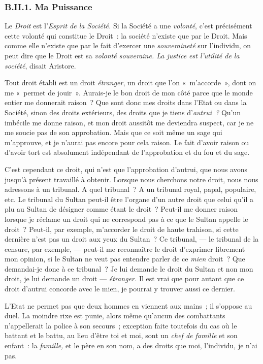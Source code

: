 \documentclass[french,twoside]{book} %
\begin{document}
\subsubsection[{B.II.1. Ma Puissance}]{B.II.1. Ma Puissance}
\noindent Le \emph{Droit} est l’\emph{Esprit de la Société.} Si la Société a une \emph{volonté}, c’est précisément cette volonté qui constitue le Droit : la société n’existe que par le Droit. Mais comme elle n’existe que par le fait d’exercer une \emph{souveraineté} sur l’individu, on peut dire que le Droit est sa \emph{volonté souveraine. La justice est l’utilité de la société}, disait Aristore.\par
Tout droit établi est un droit \emph{étranger}, un droit que l’on « m’accorde », dont on me « permet de jouir ». Aurais-je le bon droit de mon côté parce que le monde entier me donnerait raison ? Que sont donc mes droits dans l’Etat ou dans la Société, sinon des droits extérieurs, des droits que je tiens d’\emph{autrui ?} Qu’un imbécile me donne raison, et mon droit aussitôt me deviendra suspect, car je ne me soucie pas de son approbation. Mais que ce soit même un sage qui m’approuve, et je n’aurai pas encore pour cela raison. Le fait d’avoir raison ou d’avoir tort est absolument  indépendant de l’approbation et du fou et du sage.\par
C’est cependant ce droit, qui n’est que l’approbation d’autrui, que nous avons jusqu’à présent travaillé à obtenir. Lorsque nous cherchons notre droit, nous nous adressons à un tribunal. A quel tribunal ? A un tribunal royal, papal, populaire, etc. Le tribunal du Sultan peut-il être l’organe d’un autre droit que celui qu’il a plu au Sultan de désigner comme étant le droit ? Peut-il me donner raison lorsque je réclame un droit qui ne correspond pas à ce que le Sultan appelle le droit ? Peut-il, par exemple, m’accorder le droit de haute trahison, si cette dernière n’est pas un droit aux yeux du Sultan ? Ce tribunal, — le tribunal de la censure, par exemple, — peut-il me reconnaître le droit d’exprimer librement mon opinion, si le Sultan ne veut pas entendre parler de ce \emph{mien} droit ? Que demandai-je donc à ce tribunal ? Je lui demande le droit du Sultan et non mon droit, je lui demande un droit — \emph{étranger. }Il est vrai que pour autant que ce droit d’autrui concorde avec le mien, je pourrai y trouver aussi ce dernier.\par
L’Etat ne permet pas que deux hommes en viennent aux mains ; il s’oppose au duel. La moindre rixe est punie, alors même qu’aucun des combattants n’appellerait la police à son secours ; exception faite toutefois du cas où le battant et le battu, au lieu d’être toi et moi, sont un \emph{chef de famille} et son enfant : la \emph{famille,} et le père en son nom, a des droits que moi, l’individu, je n’ai pas.\par
\end{document}
